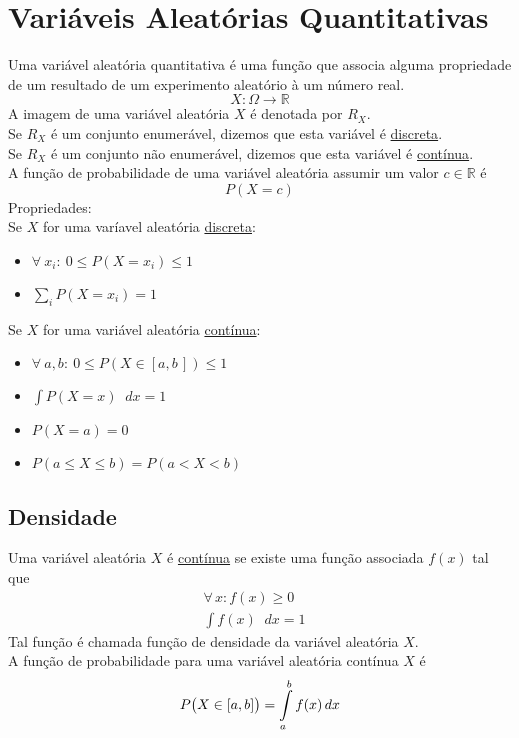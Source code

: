 \documentclass{article}
\newcommand*\diff{\mathop{}\!d}
\begin{document}
\section{Variáveis Aleatórias Quantitativas}
Uma variável aleatória quantitativa é uma função que associa alguma propriedade de um resultado de um experimento aleatório à um número real.
\[ X: \Omega \to \mathbb{R} \]
A imagem de uma variável aleatória $X$ é denotada por $R_X$. \\[5pt]
Se $R_X$ é um conjunto enumerável, dizemos que esta variável é \uline{discreta}. \\
Se $R_X$ é um conjunto não enumerável, dizemos que esta variável é \uline{contínua}. \\[10pt]
A função de probabilidade de uma variável aleatória assumir um valor $c \in \mathbb{R}$ é
\[ P(X = c) \]
Propriedades: \\[5pt]
Se $X$ for uma varíavel aleatória \uline{discreta}:
\begin{itemize}
  \item $\forall\: x_i:\> 0 \leq P(X = x_i) \leq 1$
  \item $\sum\limits_i P(X = x_i) = 1$
\end{itemize}
\vspace{-5pt}
Se $X$ for uma variável aleatória \uline{contínua}:
\begin{multicols}{2}
  \begin{itemize}
    \item $\forall\: a, b:\> 0 \leq P(X \in [a,b\,]) \leq 1$
    \item $\int P(X = x) \diff x = 1$
    \item $P(X = a) = 0$
    \item $P(a \leq X \leq b) = P(a < X < b)$
  \end{itemize}
\end{multicols}


\subsection{Densidade}
Uma variável aleatória $X$ é \uline{contínua} se existe uma função associada $f(x)$ tal que
\begin{align*}
  \forall\, x: f(x) \geq 0& \\
  \int f(x) \diff x = 1&
\end{align*}
Tal função é chamada função de densidade da variável aleatória $X$. \\[10pt]
A função de probabilidade para uma variável aleatória contínua $X$ é
\[ P\big(X \in [a, b\hspace{0.1pt}]\big) = \int\limits_a^b f(x) \diff x \]
\end{document}
